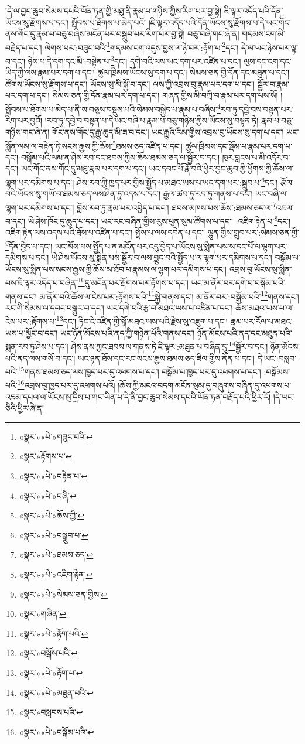 །དེ་ལ་བྱང་ཆུབ་སེམས་དཔའི་ཡོན་ཏན་གྱི་མཐུ་ནི་རྣམ་པ་གཉིས་ཀྱིས་རིག་པར་བྱ་སྟེ། ཇི་ལྟར་འདོད་པའི་དོན་ཡོངས་སུ་རྫོགས་པ་དང་། སྤོབས་པ་ཐོགས་པ་མེད་པའོ། །ཇི་ལྟར་འདོད་པའི་དོན་ཡོངས་སུ་རྫོགས་པ་དེ་ཡང་གོང་ནས་གོང་དུ་རྣམ་པ་བཅུ་བཞིས་མངོན་པར་བསྒྲུབ་པར་རིག་པར་བྱ་སྟེ། བཅུ་བཞི་གང་ཞེ་ན། གདམས་ངག་མི་བརྗེད་པ་དང་། ལེགས་པར་:བཟུང་བའི་\footnote{«སྣར་»«པེ་»གཟུང་བའི་}གདམས་ངག་འདུས་བྱས་ལ་ཉེ་བར་:རྟོག་པ་\footnote{«སྣར་»རྟོགས་པ་}དང་། དེ་ལ་ཡང་ཉེས་པར་ལྟ་བ་དང་། ཉེས་པ་དེ་དག་དང་མི་:བསྟེན་པ་\footnote{«སྣར་»«པེ་»བརྟེན་པ་}དང་། དགེ་བའི་ལས་ཡང་དག་པར་འཛིན་པ་དང་། ལུས་དང་ངག་དང་ཡིད་ཀྱི་ལས་རྣམ་པར་དག་པ་དང་། ཚུལ་ཁྲིམས་ཡོངས་སུ་དག་པ་དང་། སེམས་ཅན་གྱི་དོན་དང་མཐུན་པ་དང་། ཚོགས་ཡོངས་སུ་རྫོགས་པ་དང་། ཡོངས་སུ་མི་སྐྱོ་བ་དང་། ལས་ཀྱི་འབྲས་བུ་རྣམ་པར་དག་པ་དང་། སྦྱོར་བ་རྣམ་པར་དག་པ་དང་། སེམས་ཅན་གྱི་དོན་རྣམ་པར་དག་པ་དང་། གཞན་གྱིས་མི་བཀྲི་བ་རྣམ་པར་དག་པས་སོ། །སྤོབས་པ་ཐོགས་པ་མེད་པ་ནི་ས་བཅུས་བསྡུས་པའི་སེམས་བསྐྱེད་པ་རྣམ་པ་བཞིས་\footnote{«སྣར་»«པེ་»བཞི་}རབ་ཏུ་དབྱེ་བས་བསྟན་པར་རིག་པར་བྱའོ། །རབ་ཏུ་དབྱེ་བ་བསྟན་པ་དེ་ཡང་བཞི་པ་རྣམ་པ་བཅུ་གཉིས་ཀྱིས་ཡོངས་སུ་བསྟན་ཏེ། རྣམ་པ་བཅུ་གཉིས་གང་ཞེ་ན། གོང་ནས་གོང་དུ་རྒྱུ་ཆུད་མི་ཟ་བ་དང་། ཡང་རྒྱུའི་རིམ་གྱིས་འབྲས་བུ་ཡོངས་སུ་དག་པ་དང་། ཡང་སྨོན་ལམ་ལ་བརྟེན་ཏེ་སངས་རྒྱས་ཀྱི་ཆོས་\footnote{«སྣར་»«པེ་»ཆོས་ཀྱི་}ཐམས་ཅད་འཛིན་པ་དང་། ཚུལ་ཁྲིམས་དང་སྡོམ་པ་རྣམ་པར་དག་པ་དང་། བསྒོམ་པའི་ལམ་ན་ཤེས་རབ་དང་ཐབས་ཀྱིས་ཆོས་ཐམས་ཅད་ལ་སྦྱོར་བ་དང་། ཁུར་བླངས་པ་མི་འདོར་བ་དང་། ཡང་གོང་ནས་གོང་དུ་མཐུ་རྣམ་པར་དག་པ་དང་། ཡང་དབང་པོ་རྣོ་བའི་ཕྱིར་བྱང་ཆུབ་ཀྱི་ཕྱོགས་ཀྱི་ཆོས་ལ་ལྷག་པར་དམིགས་པ་དང་། ཤེས་རབ་ཀྱི་ཁྱད་པར་གྱིས་སྤྱོད་པ་མཐའ་ཡས་པ་ཡང་དག་པར་:སྒྲུབ་པ་\footnote{«སྣར་»«པེ་»བསྒྲུབ་པ་}དང་། རྩོལ་བའི་ཡོངས་སུ་གཡོ་བ་ཐམས་ཅད་ལས་ཤིན་ཏུ་འདས་པ་དང་། རྒྱལ་ཚབ་ཏུ་རབ་ཏུ་གནས་པ་དང་། ཡང་བཞི་ལ་ལྷག་པར་དམིགས་པ་དང་། བློས་རབ་ཏུ་རྣམ་པར་འབྱེད་པ་དང་། ཐབས་མཁས་པས་ཆོས་:ཐམས་ཅད་ལ་\footnote{«སྣར་»«པེ་»ཐམས་ཅད་}འཇལ་བ་དང་། ཡེ་ཤེས་ཁོང་དུ་ཆུད་པ་དང་། ཡང་རང་བཞིན་གྱིས་རུས་ཕུན་སུམ་ཚོགས་པ་དང་། :འཇིག་རྟེན་པ་\footnote{«སྣར་»«པེ་»འཇིག་རྟེན་}དང་། འཇིག་རྟེན་ལས་འདས་པའི་ཐོས་པ་འཛིན་པ་དང་། སྤྲོས་པ་ལས་དབེན་པ་དང་། ལྷུན་གྱིས་གྲུབ་པར་:སེམས་ཅན་གྱི་\footnote{«སྣར་»«པེ་»སེམས་ཅན་གྱིས་}དོན་བྱེད་པ་དང་། ཡང་མོས་པས་སྤྱོད་པ་ན་མངོན་པར་འདུ་བྱེད་པ་ཡོངས་སུ་སྨིན་པས་ས་དང་པོ་ལ་ལྷག་པར་དམིགས་པ་དང་། ཡེ་ཤེས་ཡོངས་སུ་སྨིན་པས་སྦྱོར་བ་ལས་བྱུང་བའི་སྤྱོད་པ་ལ་ལྷག་པར་དམིགས་པ་དང་། བསྒོམ་པ་ཡོངས་སུ་སྨིན་པས་སངས་རྒྱས་ཀྱི་ཆོས་མ་ཐོབ་པ་རྣམས་ལ་ལྷག་པར་དམིགས་པ་དང་། འབྲས་བུ་ཡོངས་སུ་སྨིན་པས་ཇི་ལྟར་འདོད་པ་བཞིན་\footnote{«སྣར་»གཞིན་}དུ་མངོན་པར་རྫོགས་པར་རྟོགས་པ་དང་། ཡང་མ་ནོར་བར་དགེ་བ་བསྒོམ་པའི་གནས་དང་། མ་ནོར་བའི་ཆོས་ལ་ངེས་པར་:རྟོགས་པའི་\footnote{«སྣར་»«པེ་»རྟོག་པའི་}སྐྱེ་གནས་དང་། མ་ནོར་བར་:བསྒོམ་པའི་\footnote{«སྣར་»བསྒོས་པའི་}གནས་དང་། རང་གི་སེམས་ལ་དབང་བསྒྱུར་བ་དང་། ཡང་དགེ་བའི་རྩ་བ་མཐའ་ཡས་པ་འཛིན་པ་དང་། ཆོས་མཐའ་ཡས་པ་ལ་ངེས་པར་:རྟོགས་པ་\footnote{«སྣར་»«པེ་»རྟོག་པ་}དང་། ཏིང་ངེ་འཛིན་གྱི་སྒོ་མཐའ་ཡས་པའི་རྗེས་སུ་འཇུག་པ་དང་། རྣམ་པར་རོལ་པ་མཐའ་ཡས་པ་མྱོང་བ་དང་། ཡང་ཉོན་མོངས་པའི་ནད་ཀྱི་གཉེན་པོའི་གནས་དང་། ཉོན་མོངས་པའི་ནད་དང་མཐུན་པའི་སྨན་རབ་ཏུ་ཤེས་པ་དང་། ཤེས་ནས་ཀྱང་ཐབས་ལ་གནས་ཏེ་ཇི་ལྟར་:མཐུན་པ་བཞིན་དུ་\footnote{«སྣར་»«པེ་»མཐུན་པའི་}སྦྱོར་བ་དང་། ཉོན་མོངས་པའི་ནད་ལས་གསོ་བ་དང་། ཡང་ཉན་ཐོས་དང་རང་སངས་རྒྱས་ཐམས་ཅད་ཟིལ་གྱིས་ནོན་པ་དང་། དེ་ཡང་:བསླབ་པའི་\footnote{«སྣར་»བསླབས་པའི་}གནས་ཐམས་ཅད་ལས་ཁྱད་པར་དུ་འཕགས་པ་དང་། བསྒོམ་པ་ཁྱད་པར་དུ་འཕགས་པ་དང་། :བསྒོམས་པའི་\footnote{«སྣར་»«པེ་»བསྒོམ་པའི་}འབྲས་བུ་ཁྱད་པར་དུ་འཕགས་པའོ། །ཆོས་ཀྱི་མངའ་བདག་མངོན་སུམ་དུ་བཞུགས་བཞིན་དུ་འཕགས་པ་འཇམ་དཔལ་ལ་ཡོངས་སུ་དྲིས་པ་གང་ཡིན་པ་དེ་ནི་བྱང་ཆུབ་སེམས་དཔའི་ཡོན་ཏན་བརྗོད་པའི་ཕྱིར་རོ། །དེ་ཡང་ཅིའི་ཕྱིར་ཞེ་ན། 